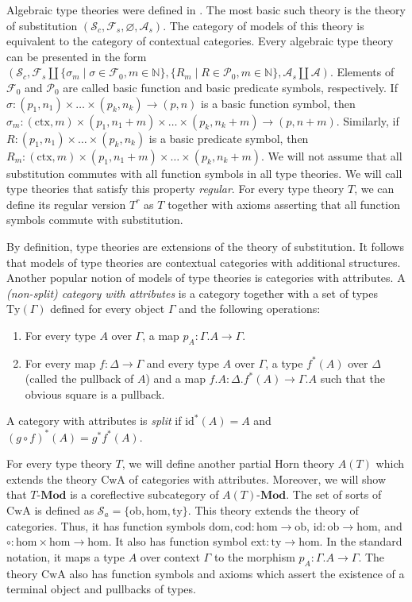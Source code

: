 \documentclass[reqno]{amsart}
\theoremstyle{definition}
\theoremstyle{remark}
\newcommand{\fs}[1]{\mathrm{#1}}
\newcommand{\bcat}[1]{\mathbf{#1}}
\newcommand{\Mod}[1]{#1\text{-}\bcat{Mod}}
\numberwithin{figure}{section}
\begin{document}
Algebraic type theories were defined in \cite{alg-tt}.
The most basic such theory is the theory of substitution $(\mathcal{S}_c, \mathcal{F}_s, \varnothing, \mathcal{A}_s)$.
The category of models of this theory is equivalent to the category of contextual categories.
Every algebraic type theory can be presented in the form $(\mathcal{S}_c, \mathcal{F}_s \amalg \{ \sigma_m \mid \sigma \in \mathcal{F}_0, m \in \mathbb{N} \}, \{ R_m \mid R \in \mathcal{P}_0, m \in \mathbb{N} \}, \mathcal{A}_s \amalg \mathcal{A})$.
Elements of $\mathcal{F}_0$ and $\mathcal{P}_0$ are called basic function and basic predicate symbols, respectively.
If $\sigma : (p_1,n_1) \times \ldots \times (p_k,n_k) \to (p,n)$ is a basic function symbol, then $\sigma_m : (\fs{ctx},m) \times (p_1,n_1+m) \times \ldots \times (p_k,n_k+m) \to (p,n+m)$.
Similarly, if $R : (p_1,n_1) \times \ldots \times (p_k,n_k)$ is a basic predicate symbol, then $R_m : (\fs{ctx},m) \times (p_1,n_1+m) \times \ldots \times (p_k,n_k+m)$.
We will not assume that all substitution commutes with all function symbols in all type theories.
We will call type theories that satisfy this property \emph{regular}.
For every type theory $T$, we can define its regular version $T^r$ as $T$ together with axioms asserting that all function symbols commute with substitution.

By definition, type theories are extensions of the theory of substitution.
It follows that models of type theories are contextual categories with additional structures.
Another popular notion of models of type theories is categories with attributes.
A \emph{(non-split) category with attributes} is a category together with a set of types $\fs{Ty}(\Gamma)$ defined for every object $\Gamma$ and the following operations:
\begin{enumerate}
\item For every type $A$ over $\Gamma$, a map $p_A : \Gamma.A \to \Gamma$.
\item For every map $f : \Delta \to \Gamma$ and every type $A$ over $\Gamma$, a type $f^*(A)$ over $\Delta$ (called the pullback of $A$) and a map $f.A : \Delta.f^*(A) \to \Gamma.A$ such that the obvious square is a pullback.
\end{enumerate}
A category with attributes is \emph{split} if $\fs{id}^*(A) = A$ and $(g \circ f)^*(A) = g^*f^*(A)$.

For every type theory $T$, we will define another partial Horn theory $A(T)$ which extends the theory $\fs{CwA}$ of categories with attributes.
Moreover, we will show that $\Mod{T}$ is a coreflective subcategory of $\Mod{A(T)}$.
The set of sorts of $\fs{CwA}$ is defined as $\mathcal{S}_a = \{ \fs{ob}, \fs{hom}, \fs{ty} \}$.
This theory extends the theory of categories.
Thus, it has function symbols $\fs{dom},\fs{cod} : \fs{hom} \to \fs{ob}$, $\fs{id} : \fs{ob} \to \fs{hom}$, and $\circ : \fs{hom} \times \fs{hom} \to \fs{hom}$.
It also has function symbol $\fs{ext} : \fs{ty} \to \fs{hom}$.
In the standard notation, it maps a type $A$ over context $\Gamma$ to the morphism $p_A : \Gamma.A \to \Gamma$.
The theory $\fs{CwA}$ also has function symbols and axioms which assert the existence of a terminal object and pullbacks of types.
\end{document}
